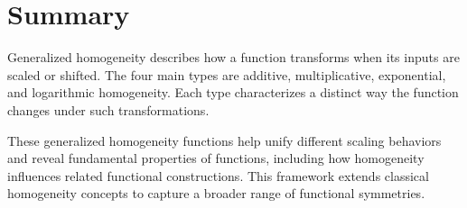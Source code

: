 \documentclass{amsart}
\makeatletter
\theoremstyle{plain}
\numberwithin{equation}{section}
\def\align{\@verbatim \frenchspacing\@vobeyspaces \@alignverbatim
You are using the "align" environment in a style in which it is not defined.}
\newcommand{\mh}{\textsc{m}}
\makeatother
\begin{document}

\section{Summary}
Generalized homogeneity describes how a function transforms when its inputs are scaled or shifted. The four main types are additive, multiplicative, exponential, and logarithmic homogeneity. Each type characterizes a distinct way the function changes under such transformations.

These generalized homogeneity functions help unify different scaling behaviors and reveal fundamental properties of functions, including how homogeneity influences related functional constructions. This framework extends classical homogeneity concepts to capture a broader range of functional symmetries.
\end{document}
